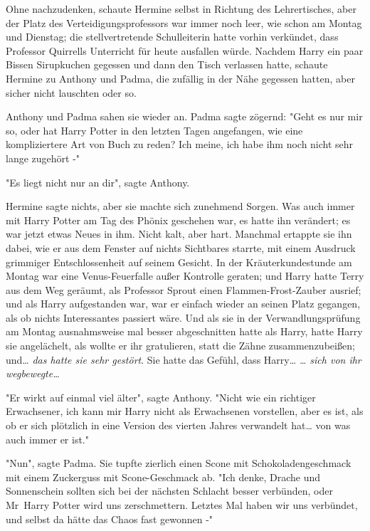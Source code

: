 {Ohne nachzudenken, schaute Hermine selbst in Richtung des Lehrertisches, aber der Platz des Verteidigungsprofessors war immer noch leer, wie schon am Montag und Dienstag; die stellvertretende Schulleiterin hatte vorhin verkündet, dass Professor Quirrells Unterricht für heute ausfallen würde. Nachdem Harry ein paar Bissen Sirupkuchen gegessen und dann den Tisch verlassen hatte, schaute Hermine zu Anthony und Padma, die zufällig in der Nähe gegessen hatten, aber sicher nicht lauschten oder so.

Anthony und Padma sahen sie wieder an. Padma sagte zögernd: "Geht es nur mir so, oder hat Harry Potter in den letzten Tagen angefangen, wie eine kompliziertere Art von Buch zu reden? Ich meine, ich habe ihm noch nicht sehr lange zugehört -"

"Es liegt nicht nur an dir", sagte Anthony.

Hermine sagte nichts, aber sie machte sich zunehmend Sorgen. Was auch immer mit Harry Potter am Tag des Phönix geschehen war, es hatte ihn verändert; es war jetzt etwas Neues in ihm. Nicht kalt, aber hart. Manchmal ertappte sie ihn dabei, wie er aus dem Fenster auf nichts Sichtbares starrte, mit einem Ausdruck grimmiger Entschlossenheit auf seinem Gesicht. In der Kräuterkundestunde am Montag war eine Venus-Feuerfalle außer Kontrolle geraten; und Harry hatte Terry aus dem Weg geräumt, als Professor Sprout einen Flammen-Frost-Zauber ausrief; und als Harry aufgestanden war, war er einfach wieder an seinen Platz gegangen, als ob nichts Interessantes passiert wäre. Und als sie in der Verwandlungsprüfung am Montag ausnahmsweise mal besser abgeschnitten hatte als Harry, hatte Harry sie angelächelt, als wollte er ihr gratulieren, statt die Zähne zusammenzubeißen; und… \emph{das hatte sie sehr gestört}. Sie hatte das Gefühl, dass Harry… \emph{… sich von ihr wegbewegte…}

"Er wirkt auf einmal viel älter", sagte Anthony. "Nicht wie ein richtiger Erwachsener, ich kann mir Harry nicht als Erwachsenen vorstellen, aber es ist, als ob er sich plötzlich in eine Version des vierten Jahres verwandelt hat… von was auch immer er ist."

"Nun", sagte Padma. Sie tupfte zierlich einen Scone mit Schokoladengeschmack mit einem Zuckerguss mit Scone-Geschmack ab. "Ich denke, Drache und Sonnenschein sollten sich bei der nächsten Schlacht besser verbünden, oder Mr~Harry Potter wird uns zerschmettern. Letztes Mal haben wir uns verbündet, und selbst da hätte das Chaos fast gewonnen -"

}
